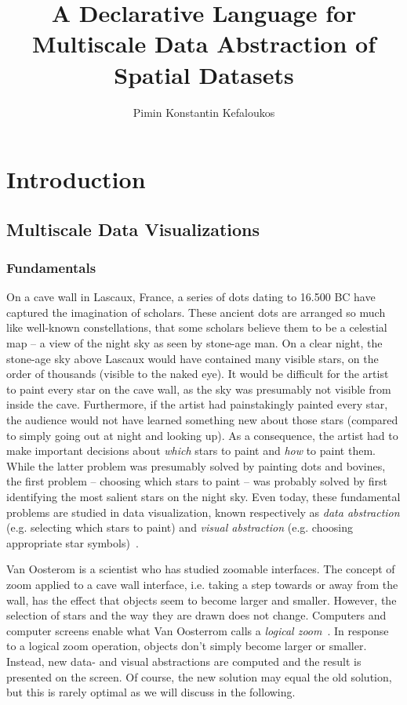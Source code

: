 \documentclass[11pt, oneside]{report}   	%
\title{A Declarative Language for Multiscale Data Abstraction of Spatial Datasets}
\author{Pimin Konstantin Kefaloukos}
\begin{document}
\maketitle

\tableofcontents

\part{Introduction}

\chapter{Multiscale Data Visualizations}

\section{Fundamentals}
On a cave wall in Lascaux, France, a series of dots dating to 16.500 BC have captured the imagination of scholars. These ancient dots are arranged so much like well-known constellations, that some scholars believe them to be a celestial map -- a view of the night sky as seen by stone-age man. On a clear night, the stone-age sky above Lascaux would have contained many visible stars, on the order of thousands (visible to the naked eye). It would be difficult for the artist to paint every star on the cave wall, as the sky was presumably not visible from inside the cave. Furthermore, if the artist had painstakingly painted every star, the audience would not have learned something new about those stars (compared to simply going out at night and looking up). As a consequence, the artist had to make important decisions about \emph{which} stars to paint and \emph{how} to paint them. While the latter problem was presumably solved by painting dots and bovines, the first problem -- choosing which stars to paint -- was probably solved by first identifying the most salient stars on the night sky. Even today, these fundamental problems are studied in data visualization, known respectively as \emph{data abstraction} (e.g. selecting which stars to paint) and \emph{visual abstraction} (e.g. choosing appropriate star symbols)~\cite{stolte2003multiscale}.

Van Oosterom is a scientist who has studied zoomable interfaces. The concept of zoom applied to a cave wall interface, i.e. taking a step towards or away from the wall, has the effect that objects seem to become larger and smaller. However, the selection of stars and the way they are drawn does not change. Computers and computer screens enable what Van Oosterrom calls a \emph{logical zoom}~\cite{van1990reactive}. In response to a logical zoom operation, objects don't simply become larger or smaller. Instead, new data- and visual abstractions are computed and the result is presented on the screen. Of course, the new solution may equal the old solution, but this is rarely optimal as we will discuss in the following.
\end{document}
